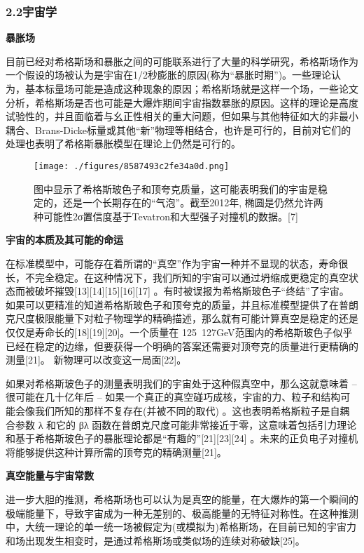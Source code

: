 \subsubsection{2.2宇宙学}

\textbf{暴胀场}

目前已经对希格斯场和暴胀之间的可能联系进行了大量的科学研究，希格斯场作为一个假设的场被认为是宇宙在1/2秒膨胀的原因(称为“暴胀时期”)。一些理论认为，基本标量场可能是造成这种现象的原因；希格斯场就是这样一个场，一些论文分析，希格斯场是否也可能是大爆炸期间宇宙指数暴胀的原因。这样的理论是高度试验性的，并且面临着与幺正性相关的重大问题，但如果与其他特征如大的非最小耦合、Brans-Dicke标量或其他“新”物理等相结合，也许是可行的，目前对它们的处理也表明了希格斯暴胀模型在理论上仍然是可行的。

\begin{figure}[ht]
\centering
\texttt{[image: ./figures/8587493c2fe34a0d.png]}
\caption{图中显示了希格斯玻色子和顶夸克质量，这可能表明我们的宇宙是稳定的，还是一个长期存在的“气泡”。截至2012年, 椭圆是仍然允许两种可能性2σ置信度基于Tevatron和大型强子对撞机的数据。[7]} \label{fig_Higgs_1}
\end{figure}

\textbf{宇宙的本质及其可能的命运}

在标准模型中，可能存在着所谓的“真空”作为宇宙一种并不显现的状态，寿命很长，不完全稳定。在这种情况下，我们所知的宇宙可以通过坍缩成更稳定的真空状态而被破坏摧毁[13][14][15][16][17] 。有时被误报为希格斯玻色子“终结”了宇宙。如果可以更精准的知道希格斯玻色子和顶夸克的质量，并且标准模型提供了在普朗克尺度极限能量下对粒子物理学的精确描述，那么就有可能计算真空是稳定的还是仅仅是寿命长的[18][19][20]。一个质量在 125~127GeV范围内的希格斯玻色子似乎已经在稳定的边缘，但要获得一个明确的答案还需要对顶夸克的质量进行更精确的测量[21]。 新物理可以改变这一局面[22]。

如果对希格斯玻色子的测量表明我们的宇宙处于这种假真空中，那么这就意味着 – 很可能在几十亿年后  – 如果一个真正的真空碰巧成核，宇宙的力、粒子和结构可能会像我们所知的那样不复存在(并被不同的取代) 。这也表明希格斯粒子是自耦合参数 λ 和它的 βλ 函数在普朗克尺度可能非常接近于零，这意味着包括引力理论和基于希格斯玻色子的暴胀理论都是“有趣的”[21][23][24] 。未来的正负电子对撞机将能够提供这种计算所需的顶夸克的精确测量[21]。

\textbf{真空能量与宇宙常数}

进一步大胆的推测，希格斯场也可以认为是真空的能量，在大爆炸的第一个瞬间的极端能量下，导致宇宙成为一种无差别的、极高能量的无特征对称性。在这种推测中，大统一理论的单一统一场被假定为(或模拟为)希格斯场，在目前已知的宇宙力和场出现发生相变时，是通过希格斯场或类似场的连续对称破缺[25]。

